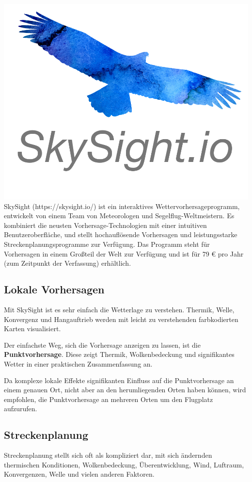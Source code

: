 \documentclass[9pt,a4paper,twocolumn]{article}
\begin{document}
\includegraphics[width=\linewidth]{images/logo.png}
SkySight (https://skysight.io/) ist ein interaktives Wettervorhersageprogramm, entwickelt von einem Team von Meteorologen und Segelflug-Weltmeistern. Es kombiniert die neusten Vorhersage-Technologien mit einer intuitiven Benutzeroberfläche, und stellt hochauflösende Vorhersagen und leistungsstarke Streckenplanungsprogramme zur Verfügung. Das Programm steht für Vorhersagen in einem Großteil der Welt zur Verfügung und ist für 79 {\euro} pro Jahr (zum Zeitpunkt der Verfassung) erhältlich.


 
\subsection*{Lokale Vorhersagen}
Mit SkySight ist es sehr einfach die Wetterlage zu verstehen. Thermik, Welle, Konvergenz und Hangauftrieb werden mit leicht zu verstehenden farbkodierten Karten visualisiert. 

Der einfachste Weg, sich die Vorhersage anzeigen zu lassen, ist die \textbf{Punktvorhersage}. Diese zeigt Thermik, Wolkenbedeckung und signifikantes Wetter in einer praktischen Zusammenfassung an.

Da komplexe lokale Effekte signifikanten Einfluss auf die Punktvorhersage an einem genauen Ort, nicht aber an den herumliegenden Orten haben können, wird empfohlen, die Punktvorhersage an mehreren Orten um den Flugplatz aufzurufen.


\subsection*{Streckenplanung}
Streckenplanung stellt sich oft als kompliziert dar, mit sich ändernden thermischen Konditionen, Wolkenbedeckung, Überentwicklung, Wind, Luftraum, Konvergenzen, Welle und vielen anderen Faktoren.
\end{document}
